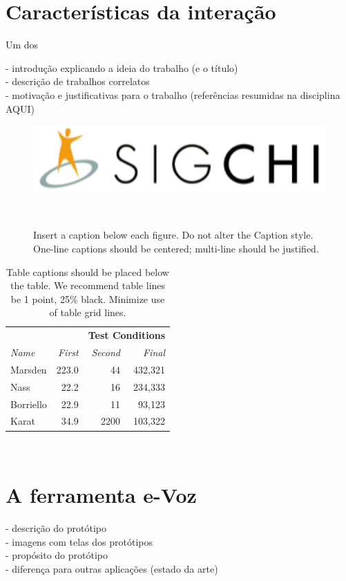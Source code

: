 \documentclass{sigchi}
\begin{document}
\section{Características da interação}
Um dos 

- introdução explicando a ideia do trabalho (e o título)\\
- descrição de trabalhos correlatos\\
- motivação e justificativas para o trabalho (referências resumidas na disciplina AQUI)\\


\begin{figure}
\centering
  \includegraphics[width=0.9\columnwidth]{figures/sigchi-logo}
  \caption{Insert a caption below each figure. Do not alter the
    Caption style.  One-line captions should be centered; multi-line
    should be justified. }~\label{fig:figure1}
\end{figure}


\begin{table}
  \centering
  \begin{tabular}{l r r r}
    & & \multicolumn{2}{c}{\small{\textbf{Test Conditions}}} \\
    \cmidrule(r){3-4}
    {\small\textit{Name}}
    & {\small \textit{First}}
      & {\small \textit{Second}}
    & {\small \textit{Final}} \\
    \midrule
    Marsden & 223.0 & 44 & 432,321 \\
    Nass & 22.2 & 16 & 234,333 \\
    Borriello & 22.9 & 11 & 93,123 \\
    Karat & 34.9 & 2200 & 103,322 \\
  \end{tabular}
  \caption{Table captions should be placed below the table. We
    recommend table lines be 1 point, 25\% black. Minimize use of
    table grid lines.}~\label{tab:table1}
\end{table}


\section{A ferramenta e-Voz}
- descrição do protótipo\\
- imagens com telas dos protótipos\\
- propósito do protótipo\\
- diferença para outras aplicações (estado da arte)\\
\end{document}
